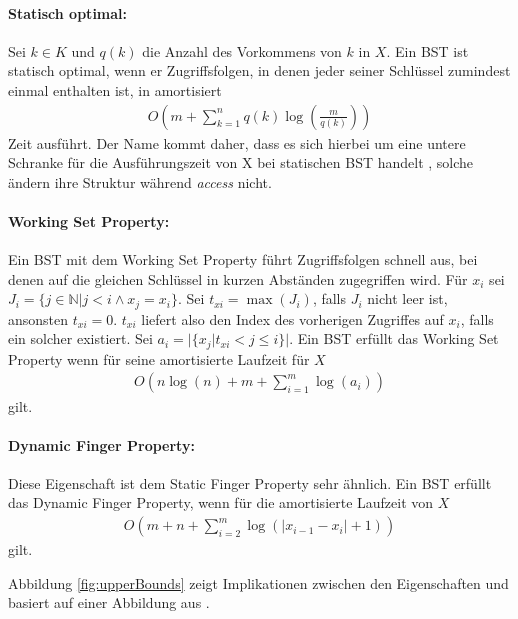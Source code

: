 \documentclass[a4paper,12pt]{article}
\begin{document}
\paragraph{Statisch optimal:}
Sei $k \in K$ und $q(k)$ die Anzahl des Vorkommens von $k$ in  $X$. Ein BST ist statisch optimal, wenn er Zugriffsfolgen, in denen jeder seiner Schlüssel zumindest einmal enthalten ist, in amortisiert 
\begin{align*}
O\left(m +\sum_{k = 1}^{n}q(k)\log \left( \frac{m}{q(k)} \right)\right) 
\end{align*}
Zeit ausführt. Der Name kommt daher, dass es sich hierbei um eine untere Schranke für die Ausführungszeit von X bei statischen BST handelt \cite{staticOptimal}, solche ändern ihre Struktur während \textit{access} nicht.

\paragraph{Working Set Property:}
Ein BST mit dem Working Set Property führt Zugriffsfolgen schnell aus, bei denen auf die gleichen Schlüssel in kurzen Abständen zugegriffen wird.
Für $x_i$ sei $J_i = \{j \in \mathbb{N} \vert j < i \land x_j = x_i \}$.
Sei $t_{xi} = \max \left(J_i\right)$, falls $J_i$ nicht leer ist, ansonsten $t_{xi} = 0$. $t_{xi}$ liefert also den Index des vorherigen Zugriffes auf $x_i$, falls ein solcher existiert. Sei ${a_i = \vert\{x_j \vert t_{xi} < j \leq i   \} \vert }$.
Ein BST erfüllt das Working Set Property wenn für seine amortisierte Laufzeit für $X$
\begin{align*}
O\left(n \log\left( n\right) + m +\sum_{i = 1}^{m} \log \left(a_i\right) \right)
\end{align*} 
gilt. 


\paragraph{Dynamic Finger Property:}
Diese Eigenschaft ist dem Static Finger Property sehr ähnlich.
Ein BST erfüllt das Dynamic Finger Property, wenn für die amortisierte Laufzeit von $X$
\begin{align*}
O\left( m + n + \sum_{i = 2}^{m} \log \left(\vert x_{i-1} - x_i  \vert	+ 1	\right)\right)
\end{align*} 
gilt. 

\noindent Abbildung \ref{fig:upperBounds} zeigt Implikationen zwischen den Eigenschaften und basiert auf einer Abbildung aus \cite{upperBounds}.
\end{document}
